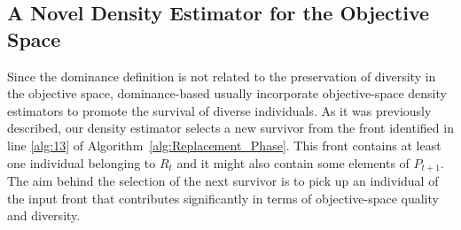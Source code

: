 %
%
%
%
%
%
%

%
%
%
%

\subsection{A Novel Density Estimator for the Objective Space}
\label{subsection:density}

Since the dominance definition is not related to the preservation of diversity in the objective space,
dominance-based \MOEAS{} usually incorporate objective-space density estimators to promote the survival
of diverse individuals.
%
As it was previously described, our density estimator selects a new survivor from the front identified
in line \ref{alg:13} of Algorithm~\ref{alg:Replacement_Phase}.
%
This front contains at least one individual belonging to $R_t$ and it might also contain some elements 
of $P_{t+1}$.
%
The aim behind the selection of the next survivor is to pick up an individual of the input front
that contributes significantly in terms of objective-space quality and diversity. %

